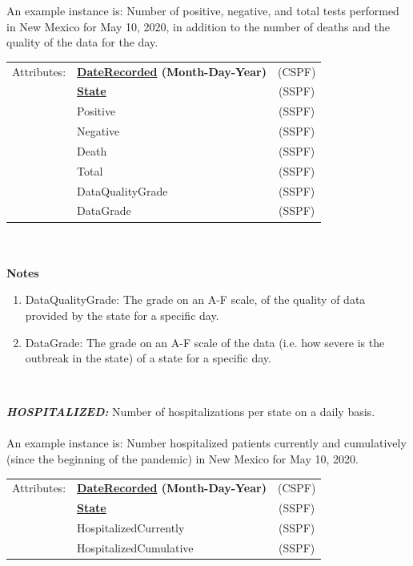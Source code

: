 \documentclass[11pt]{article}
\begin{document}
\begin{description}
An example instance is: Number of positive, negative, and total tests performed in New Mexico for May 10, 2020, in addition to the number of deaths and the quality of the data for the day. \\
 
\begin{tabular}{llc}
 Attributes: & {\bf \underline{DateRecorded} (Month-Day-Year)} &  (CSPF) \\
	    & {\bf \underline{State}} &  (SSPF) \\
	    & Positive & (SSPF) \\
	    & Negative & (SSPF) \\
	    & Death & (SSPF) \\
	    & Total & (SSPF) \\
	    & DataQualityGrade & (SSPF) \\
	    & DataGrade & (SSPF) \\
\end{tabular} \\
\\
\textbf{Notes}
\begin{enumerate}
    \item DataQualityGrade: The grade on an A-F scale, of the quality of data provided by the state for a specific day.
    \item DataGrade: The grade on an A-F scale of the data (i.e. how severe is the outbreak in the state) of a state for a specific day.
\end{enumerate} \\

\item{\em\bf HOSPITALIZED:} Number of hospitalizations per state on a daily basis. \\ \\

An example instance is: Number hospitalized patients currently and cumulatively (since the beginning of the pandemic) in New Mexico for May 10, 2020. \\
 
\begin{tabular}{llc}
 Attributes: & {\bf \underline{DateRecorded} (Month-Day-Year)} &  (CSPF) \\
	    & {\bf \underline{State}} &  (SSPF) \\
	    & HospitalizedCurrently & (SSPF) \\
	    & HospitalizedCumulative & (SSPF) \\
\end{tabular} \\


\end{description}
\end{document}
